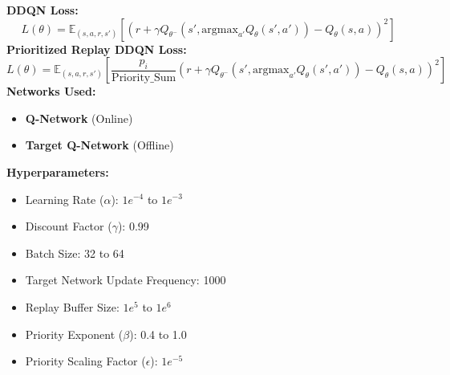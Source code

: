 \documentclass[a4paper,10pt]{article}
\begin{document}
\begin{multicols}{2}
\[\]
\textbf{DDQN Loss:}
\[
L(\theta) = \mathbb{E}_{(s, a, r, s')} \left[ \left( r + \gamma Q_{\theta^-}(s', \text{argmax}_{a'} Q_\theta(s', a')) - Q_\theta(s, a) \right)^2 \right]
\]
\textbf{Prioritized Replay DDQN Loss:}
\[
L(\theta) = \mathbb{E}_{(s, a, r, s')} \left[ \frac{p_i}{\text{Priority\_Sum}} \left( r + \gamma Q_{\theta^-}(s', \text{argmax}_{a'} Q_\theta(s', a')) - Q_\theta(s, a) \right)^2 \right]
\]
\textbf{Networks Used:} 
\begin{itemize}
    \item \textbf{Q-Network} (Online)
    \item \textbf{Target Q-Network} (Offline)
\end{itemize}
\textbf{Hyperparameters:}
\begin{itemize}
    \item Learning Rate (\(\alpha\)): \(1e^{-4}\) to \(1e^{-3}\)
    \item Discount Factor (\(\gamma\)): 0.99
    \item Batch Size: 32 to 64
    \item Target Network Update Frequency: 1000
    \item Replay Buffer Size: \(1e^5\) to \(1e^6\)
    \item Priority Exponent (\(\beta\)): 0.4 to 1.0
    \item Priority Scaling Factor (\(\epsilon\)): \(1e^{-5}\)
\end{itemize}


\end{multicols}
\end{document}
